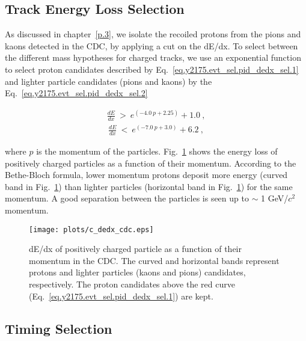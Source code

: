 \subsection{Track Energy Loss Selection}
\label{chap.y2175.evt_sel.pid_dedx_sel}

As discussed in chapter~\ref{p.3}, we isolate the recoiled protons from the pions and kaons detected in the CDC, by applying a cut on the dE/dx. To select between the different mass hypotheses for charged tracks, we use an exponential function to select proton candidates described by Eq.~\ref{eq.y2175.evt_sel.pid_dedx_sel.1} and lighter particle candidates (pions and kaons) by the Eq.~\ref{eq.y2175.evt_sel.pid_dedx_sel.2}

\begin{equation}
    \begin{aligned}
        \label{eq.y2175.evt_sel.pid_dedx_sel.1}
        \frac{dE}{dx}~>~e^{(-4.0~p + 2.25)} + 1.0~,
    \end{aligned}
\end{equation}
\begin{equation}
    \begin{aligned}
        \label{eq.y2175.evt_sel.pid_dedx_sel.2}
        \frac{dE}{dx}~<~e^{(-7.0~p + 3.0)} + 6.2~,
    \end{aligned}
\end{equation}

where $p$ is the momentum of the particles.
Fig.~\ref{fig.y2175.evt_sel.pid_dedx_sel} shows the energy loss of positively charged particles as a function of their momentum. According to the Bethe-Bloch formula, lower momentum protons deposit more energy (curved band in Fig.~\ref{fig.y2175.evt_sel.pid_dedx_sel}) than lighter particles (horizontal band in Fig.~\ref{fig.y2175.evt_sel.pid_dedx_sel}) for the same momentum. A good separation between the particles is seen up to $\sim$ 1 GeV/$c^{2}$ momentum.

\begin{figure}[H]
    \centering
        \texttt{[image: plots/c\_dedx\_cdc.eps]}
        \caption{dE/dx of positively charged particle as a function of their momentum in the CDC. The curved and horizontal bands represent protons and lighter particles (kaons and pions) candidates, respectively. The proton candidates above the red curve (Eq.~\ref{eq.y2175.evt_sel.pid_dedx_sel.1}) are kept.}
        \label{fig.y2175.evt_sel.pid_dedx_sel}
\end{figure}

\subsection{Timing Selection}
\label{chap.y2175.evt_sel.pid_tim_sel}

